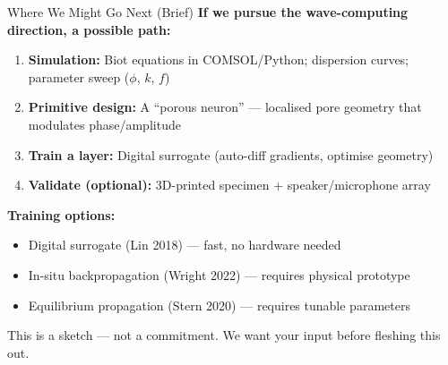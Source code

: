 \documentclass[aspectratio=169,11pt]{beamer}
\begin{document}
\begin{frame}{Where We Might Go Next (Brief)}
  \textbf{If we pursue the wave-computing direction, a possible path:}
  \vspace{0.1cm}

  {\small
  \begin{enumerate}
    \item \textbf{Simulation:} Biot equations in COMSOL/Python; dispersion curves; parameter sweep ($\phi$, $k$, $f$)
    \item \textbf{Primitive design:} A ``porous neuron'' --- localised pore geometry that modulates phase/amplitude
    \item \textbf{Train a layer:} Digital surrogate (auto-diff gradients, optimise geometry)
    \item \textbf{Validate (optional):} 3D-printed specimen + speaker/microphone array
  \end{enumerate}
  }

  \vspace{0.1cm}
  {\small \textbf{Training options:}}
  \begin{itemize}
    \item {\small Digital surrogate (Lin 2018) --- fast, no hardware needed}
    \item {\small In-situ backpropagation (Wright 2022) --- requires physical prototype}
    \item {\small Equilibrium propagation (Stern 2020) --- requires tunable parameters}
  \end{itemize}

  \vspace{0.05cm}
  \textcolor{gdpSlate}{\footnotesize This is a sketch --- not a commitment. We want your input before fleshing this out.}
\end{frame}
\end{document}
